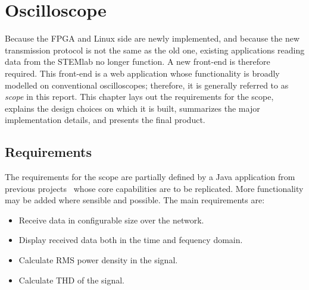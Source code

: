 \chapter{Oscilloscope} %
\label{ch:graphical_front_end}

Because the  FPGA and Linux  side are newly  implemented, and because  the new
transmission protocol  is not the same  as the old one,  existing applications
reading data from the STEMlab no longer function. A new front-end is therefore
required. This front-end is  a web application whose  functionality is broadly
modelled on conventional oscilloscopes; therefore, it is generally referred to
as \emph{scope} in this report. This chapter lays out the requirements for the
scope, explains the design choices on  which it is built, summarizes the major
implementation details, and presents the final product.

%
%

\section{Requirements} %
\label{sec:gui:requirements}

The requirements  for the scope  are partially  defined by a  Java application
from  previous projects~\cite{gut:specky}  whose core  capabilities are  to be
replicated. More functionality  may be added where  sensible and possible. The
main requirements are:
\begin{itemize}\tightlist
    \item Receive data in configurable size over the network.
    \item Display received data both in the time and fequency domain.
    \item Calculate RMS power density in the signal.
    \item Calculate THD of the signal.
\end{itemize}

%
%

